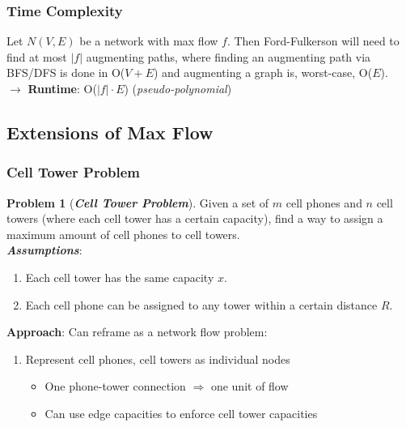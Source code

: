 \documentclass[12pt]{extarticle}
\theoremstyle{definition}
\newtheorem*{problem}{Problem}
\theoremstyle{remark}
\newcommand{\probname}[1]{\noindent \textbf{\textit{#1}}}
\begin{document}
\subsubsection*{Time Complexity}
Let $N(V,E)$ be a network with max flow $f$. Then Ford-Fulkerson will need to find at most $|f|$ augmenting paths, where finding an augmenting path via BFS/DFS is done in O($V+E$) and augmenting a graph is, worst-case, O($E$).\\

\noindent$\to$ \textbf{Runtime}: O($|f|\cdot E$) (\textit{pseudo-polynomial})

\pagebreak
\subsection{Extensions of Max Flow}
\subsubsection{Cell Tower Problem}
\begin{problem}[\probname{Cell Tower Problem}]
    Given a set of $m$ cell phones and $n$ cell towers (where each cell tower has a certain capacity), find a way to assign a maximum amount of cell phones to cell towers.\\

    \noindent\textbf{\textit{Assumptions}}:
    \begin{enumerate}
        \item Each cell tower has the same capacity $x$.
        \item Each cell phone can be assigned to any tower within a certain distance $R$.
    \end{enumerate}
\end{problem}

\noindent \textbf{Approach}: Can reframe as a network flow problem: \begin{enumerate}
    \item Represent cell phones, cell towers as individual nodes \begin{itemize}
        \item One phone-tower connection $\Rightarrow$ one unit of flow
        \item Can use edge capacities to enforce cell tower capacities
    \end{itemize}
\end{enumerate}
\end{document}

